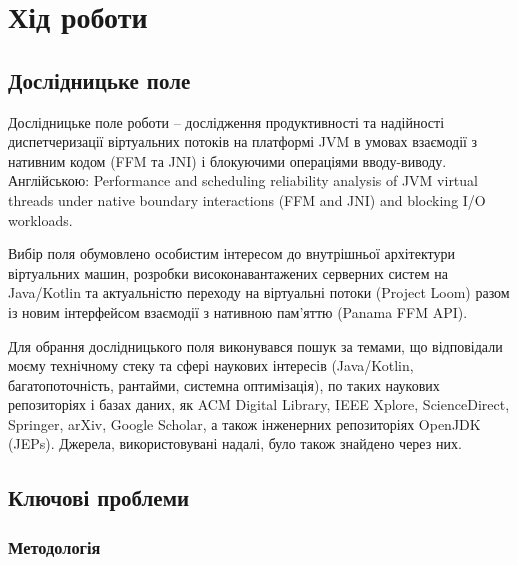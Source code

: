 \chapter{Хід роботи}

\section{Дослідницьке поле}

Дослідницьке поле роботи -- дослідження продуктивності та надійності диспетчеризації віртуальних потоків на платформі JVM в умовах взаємодії з нативним кодом (FFM та JNI) і блокуючими операціями вводу-виводу. Англійською: \foreignlanguage{english}{Performance and scheduling reliability analysis of JVM virtual threads under native boundary interactions (FFM and JNI) and blocking I/O workloads.}

Вибір поля обумовлено особистим інтересом до внутрішньої архітектури віртуальних машин, розробки високонавантажених серверних систем на Java/Kotlin та актуальністю переходу на віртуальні потоки (Project Loom) разом із новим інтерфейсом взаємодії з нативною пам'яттю (Panama FFM API).

Для обрання дослідницького поля виконувався пошук за темами, що відповідали моєму технічному стеку та сфері наукових інтересів (Java/Kotlin, багатопоточність, рантайми, системна оптимізація), по таких наукових репозиторіях і базах даних, як ACM Digital Library, IEEE Xplore, ScienceDirect, Springer, arXiv, Google Scholar, а також інженерних репозиторіях OpenJDK (JEPs). Джерела, використовувані надалі, було також знайдено через них.

\section{Ключові проблеми}

\subsection{Методологія}

